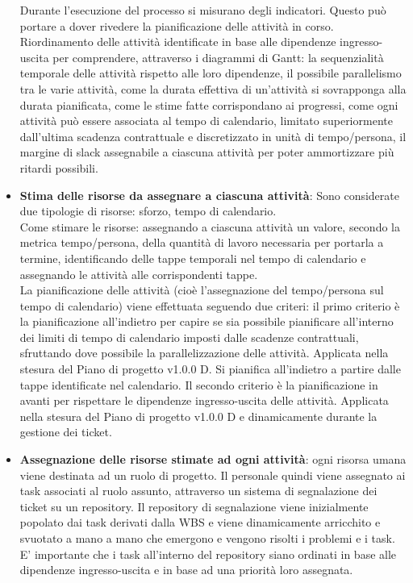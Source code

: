 \begin{itemize}
     Durante l'esecuzione del processo si misurano degli indicatori. Questo può portare a dover rivedere la pianificazione delle attività in corso. \\
     Riordinamento delle attività identificate in base alle dipendenze ingresso-uscita per comprendere, attraverso i diagrammi di Gantt: la sequenzialità temporale delle attività rispetto alle loro dipendenze, il possibile parallelismo tra le varie attività, come la durata effettiva di un'attività si sovrapponga alla durata pianificata, come le stime fatte corrispondano ai progressi, come ogni attività può essere associata al tempo di calendario, limitato superiormente dall'ultima scadenza contrattuale e discretizzato in unità di tempo/persona, il margine di slack assegnabile a ciascuna attività per poter ammortizzare più ritardi possibili.
    \item \textbf{Stima delle risorse da assegnare a ciascuna attività}: Sono considerate due tipologie di risorse: sforzo, tempo di calendario. \\
     Come stimare le risorse: assegnando a ciascuna attività un valore, secondo la metrica tempo/persona, della quantità di lavoro necessaria per portarla a termine, identificando delle tappe temporali nel tempo di calendario e assegnando le attività alle corrispondenti tappe.\\
     La pianificazione delle attività (cioè l'assegnazione del tempo/persona sul tempo di calendario) viene effettuata seguendo due criteri: il primo criterio è la pianificazione all'indietro per capire se sia possibile pianificare all'interno dei limiti di tempo di calendario imposti dalle scadenze contrattuali, sfruttando dove possibile la parallelizzazione delle attività. Applicata nella stesura del Piano di progetto v1.0.0 D. Si pianifica all'indietro a partire dalle tappe identificate nel calendario. Il secondo criterio è la pianificazione in avanti per rispettare le dipendenze ingresso-uscita delle attività. Applicata nella stesura del Piano di progetto v1.0.0 D e dinamicamente durante la gestione dei ticket.
    \item \textbf{Assegnazione delle risorse stimate ad ogni attività}: ogni risorsa umana viene destinata ad un ruolo di progetto. Il personale quindi viene assegnato ai task associati al ruolo assunto, attraverso un sistema di segnalazione dei ticket su un repository. Il repository di segnalazione viene inizialmente popolato dai task derivati dalla WBS e viene dinamicamente arricchito e svuotato a mano a mano che emergono e vengono risolti i problemi e i task. E' importante che i task all'interno del repository siano ordinati in base alle dipendenze ingresso-uscita e in base ad una priorità loro assegnata.
\end{itemize}

